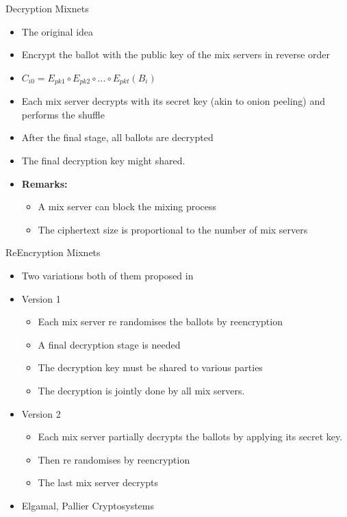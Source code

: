 \documentclass{beamer}
\begin{document}
\begin{frame}{Decryption Mixnets}
\begin{itemize}
\item The original \cite{Chaum81} idea
\item Encrypt the ballot with the public key of the mix servers in reverse order
\item $ C_{i0} = E_{pk1} \circ E_{pk2} \circ ... \circ E_{pkt} (B_i) $
\item Each mix server decrypts with its secret key (akin to onion peeling) and performs the shuffle
\item After the final stage, all ballots are decrypted
\item The final decryption key might shared.
\item \textbf{Remarks:} 
\begin{itemize}
\item A mix server can block the mixing process
\item The ciphertext size is proportional to the number of mix servers
\end{itemize} 
\end{itemize}
\end{frame} 

\begin{frame}{ReEncryption Mixnets \cite{PIK93}}

\begin{itemize} 
\item Two variations both of them proposed in \cite{PIK93}
\item Version 1
\begin{itemize}
	\item Each mix server re randomises the ballots by reencryption
	\item A final decryption stage is needed
	\item The decryption key must be shared to various parties
	\item The decryption is jointly done by all mix servers.
\end{itemize}
\item Version 2
\begin{itemize}
	\item Each mix server partially decrypts the ballots by applying its secret key.
	\item Then re randomises by reencryption
	\item The last mix server decrypts
\end{itemize}
\item Elgamal, Pallier Cryptosystems
\end{itemize}

\end{frame} 
\end{document}
